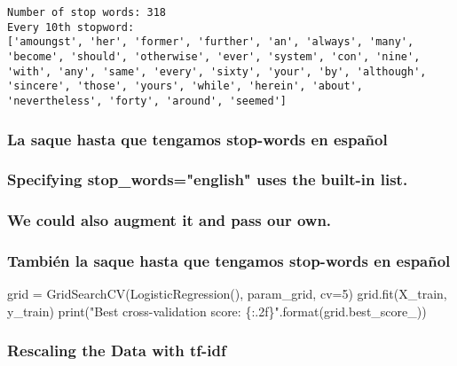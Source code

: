 \documentclass[11pt]{article}
\begin{document}
    \begin{Verbatim}[commandchars=\\\{\}]
Number of stop words: 318
Every 10th stopword:
['amoungst', 'her', 'former', 'further', 'an', 'always', 'many', 'become', 'should', 'otherwise', 'ever', 'system', 'con', 'nine', 'with', 'any', 'same', 'every', 'sixty', 'your', 'by', 'although', 'sincere', 'those', 'yours', 'while', 'herein', 'about', 'nevertheless', 'forty', 'around', 'seemed']

    \end{Verbatim}

    \subsubsection{La saque hasta que tengamos stop-words en
español}\label{la-saque-hasta-que-tengamos-stop-words-en-espauxf1ol}

\subsubsection{Specifying stop\_words="english" uses the built-in
list.}\label{specifying-stop_wordsenglish-uses-the-built-in-list.}

\subsubsection{We could also augment it and pass our
own.}\label{we-could-also-augment-it-and-pass-our-own.}




    \subsubsection{También la saque hasta que tengamos stop-words en
español}\label{tambiuxe9n-la-saque-hasta-que-tengamos-stop-words-en-espauxf1ol}

grid = GridSearchCV(LogisticRegression(), param\_grid, cv=5)
grid.fit(X\_train, y\_train) print("Best cross-validation score:
\{:.2f\}".format(grid.best\_score\_))

    \subsubsection{Rescaling the Data with
tf-idf}\label{rescaling-the-data-with-tf-idf}
\end{document}
